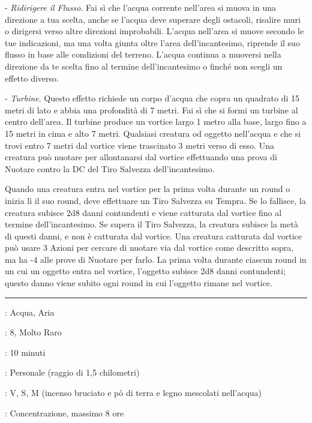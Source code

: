 \begin{multicols}{2}
- \emph{Ridirigere il Flusso}. Fai sì che l'acqua corrente nell'area si muova in una direzione a tua scelta, anche se l'acqua deve superare degli ostacoli, risalire muri o dirigersi verso altre direzioni improbabili. L'acqua nell'area si muove secondo le tue indicazioni, ma una volta giunta oltre l'area dell'incantesimo, riprende il suo flusso in base alle condizioni del terreno. L'acqua continua a muoversi nella direzione da te scelta fino al termine dell'incantesimo o finché non scegli un effetto diverso.

- \emph{Turbine}. Questo effetto richiede un corpo d'acqua che copra un quadrato di 15 metri di lato e abbia una profondità di 7 metri. Fai sì che si formi un turbine al centro dell'area. Il turbine produce un vortice largo 1 metro alla base, largo fino a 15 metri in cima e alto 7 metri. Qualsiasi creatura od oggetto nell'acqua e che si trovi entro 7 metri dal vortice viene trascinato 3 metri verso di esso. Una creatura può nuotare per allontanarsi dal vortice effettuando una prova di Nuotare contro la DC del Tiro Salvezza dell'incantesimo.

Quando una creatura entra nel vortice per la prima volta durante un round o inizia lì il suo round, deve effettuare un Tiro Salvezza su Tempra. Se lo fallisce, la creatura subisce 2d8 danni contundenti e viene catturata dal vortice fino al termine dell'incantesimo. Se supera il Tiro Salvezza, la creatura subisce la metà di questi danni, e non è catturata dal vortice. Una creatura catturata dal vortice può usare 3 Azioni per cercare di nuotare via dal vortice come descritto sopra, ma ha -4 alle prove di Nuotare per farlo. La prima volta durante ciascun round in un cui un oggetto entra nel vortice, l'oggetto subisce 2d8 danni contundenti; questo danno viene subito ogni round in cui l'oggetto rimane nel vortice.

\smallskip\noindent\rule{\linewidth}{2pt} \hypertarget{Controllare Tempo Atmosferico}{}\medskip{}
\noindent
\begin{description}[noitemsep, topsep=0pt, parsep=0pt, partopsep=0pt, leftmargin=0cm, labelwidth=2.8cm]
	\item[\textbf{Lista di Magia}]: Acqua, Aria
	\item[\textbf{Livello}]: 8, Molto Raro
	\item[\textbf{T. di Lancio}]: 10 minuti
	\item[\textbf{Gittata}]: Personale (raggio di 1,5 chilometri)
	\item[\textbf{Componenti}]: V, S, M (incenso bruciato e pò di terra e legno mescolati nell'acqua)
	\item[\textbf{Durata}]: Concentrazione, massimo 8 ore
\end{description}


\end{multicols}
